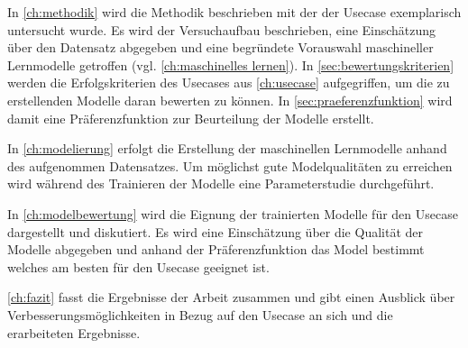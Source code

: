 In \cref{ch:methodik} wird die Methodik beschrieben mit der der Usecase exemplarisch untersucht wurde. Es wird der Versuchaufbau beschrieben, eine Einschätzung über den Datensatz abgegeben und eine begründete Vorauswahl maschineller Lernmodelle getroffen (vgl. \cref{ch:maschinelles lernen}). In \cref{sec:bewertungskriterien} werden die Erfolgskriterien des Usecases aus \cref{ch:usecase} aufgegriffen, um die zu erstellenden Modelle daran bewerten zu können. In \cref{sec:praeferenzfunktion} wird damit eine Präferenzfunktion zur Beurteilung der Modelle erstellt.

In \cref{ch:modelierung} erfolgt die Erstellung der maschinellen Lernmodelle anhand des aufgenommen Datensatzes. Um möglichst gute Modelqualitäten zu erreichen wird während des Trainieren der Modelle eine Parameterstudie durchgeführt.

In \cref{ch:modelbewertung} wird die Eignung der trainierten Modelle für den Usecase dargestellt und diskutiert. Es wird eine Einschätzung über die Qualität der Modelle abgegeben und anhand der Präferenzfunktion das Model bestimmt welches am besten für den Usecase geeignet ist.

\cref{ch:fazit} fasst die Ergebnisse der Arbeit zusammen und gibt einen Ausblick über Verbesserungsmöglichkeiten in Bezug auf den Usecase an sich und die erarbeiteten Ergebnisse.